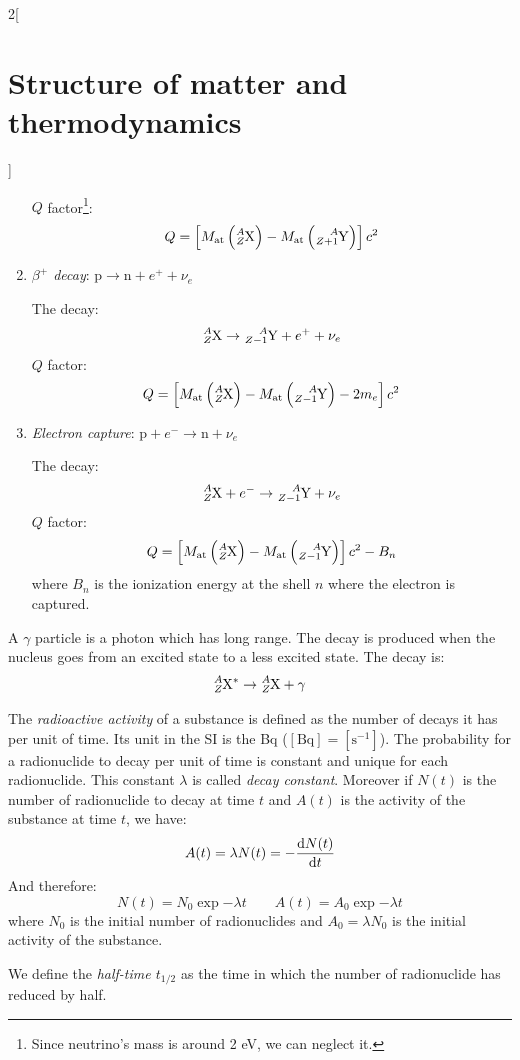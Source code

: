 \documentclass[../../../main.tex]{subfiles}
\begin{document}
\begin{multicols}{2}[\section{Structure of matter and thermodynamics}]
\begin{definition}
\begin{enumerate}
                  $Q$ factor\footnote{Since neutrino's mass is around 2 eV, we can neglect it.}: $$Q=\left[M_\text{at}\left(\ce{^$A$_$Z$X}\right)-M_\text{at}\left(\ce{^$A$_$Z+1$Y}\right)\right]c^2$$
            \item \textit{$\beta^+$ decay}: $\text{p}\rightarrow\text{n}+e^++\nu_e$\par
                  The decay: $$\ce{^$A$_$Z$X}\rightarrow\ce{^$A$_$Z-1$Y}+e^++\nu_e$$
                  $Q$ factor: $$Q=\left[M_\text{at}\left(\ce{^$A$_$Z$X}\right)-M_\text{at}\left(\ce{^$A$_$Z-1$Y}\right)-2m_e\right]c^2$$
            \item \textit{Electron capture}: $\text{p}+e^-\rightarrow\text{n}+\nu_e$\par
                  The decay: $$\ce{^$A$_$Z$X}+e^-\rightarrow\ce{^$A$_$Z-1$Y}+\nu_e$$
                  $Q$ factor: $$Q=\left[M_\text{at}\left(\ce{^$A$_$Z$X}\right)-M_\text{at}\left(\ce{^$A$_$Z-1$Y}\right)\right]c^2-B_n$$
                  where $B_n$ is the ionization energy at the shell $n$ where the electron is captured.
        \end{enumerate}
    \end{definition}
    \begin{definition}
        A $\gamma$ particle is a photon which has long range. The decay is produced when the nucleus goes from an excited state to a less excited state. The decay is: $$\ce{^$A$_$Z$X}^*\rightarrow\ce{^$A$_$Z$X}+\gamma$$
    \end{definition}
    \begin{definition}
        The \textit{radioactive activity} of a substance is defined as the number of decays it has per unit of time. Its unit in the SI is the Bq ($[\text{Bq}]=[\text{s}^{-1}]$). The probability for a radionuclide to decay per unit of time is constant and unique for each radionuclide. This constant $\lambda$ is called \textit{decay constant}. Moreover if $N(t)$ is the number of radionuclide to decay at time $t$ and $A(t)$ is the activity of the substance at time $t$, we have:
        $$A(t)=\lambda N(t)=-\dv{N(t)}{t}$$ And therefore:
        $$N(t)=N_0\exp{-\lambda t}\qquad A(t)=A_0\exp{-\lambda t}$$
        where $N_0$ is the initial number of radionuclides and $A_0=\lambda N_0$ is the initial activity of the substance.
    \end{definition}
    \begin{definition}
        We define the \textit{half-time $t_{1/2}$} as the time in which the number of radionuclide has reduced by half.

\end{definition}
\end{multicols}
\end{document}
